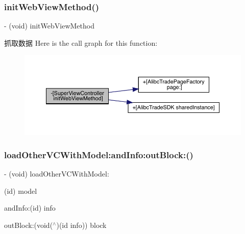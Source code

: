 \subsubsection{\texorpdfstring{init\+Web\+View\+Method()}{initWebViewMethod()}}
{\footnotesize\ttfamily -\/ (void) init\+Web\+View\+Method \begin{DoxyParamCaption}{ }\end{DoxyParamCaption}}

抓取数据 Here is the call graph for this function\+:\nopagebreak
\begin{figure}[H]
\begin{center}
\leavevmode
\includegraphics[width=350pt]{interface_super_view_controller_a63c776a89d192c745618d2e9a5eca8dd_cgraph}
\end{center}
\end{figure}
\mbox{\label{interface_super_view_controller_a91b1b37610661a7de282a125a486b350}} 
\subsubsection{\texorpdfstring{load\+Other\+V\+C\+With\+Model\+:and\+Info\+:out\+Block\+:()}{loadOtherVCWithModel:andInfo:outBlock:()}}
{\footnotesize\ttfamily -\/ (void) load\+Other\+V\+C\+With\+Model\+: \begin{DoxyParamCaption}\item[{(id)}]{model }\item[{andInfo:(id)}]{info }\item[{outBlock:(void($^\wedge$)(id info))}]{block }\end{DoxyParamCaption}}

